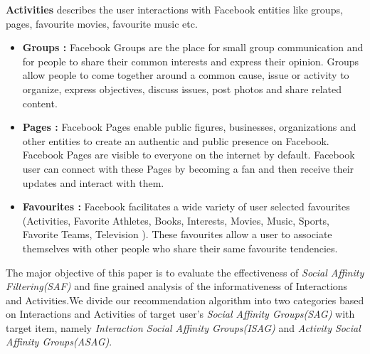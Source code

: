 {\bf Activities} describes the user interactions with Facebook entities like groups, pages, favourite movies, favourite music etc.
\begin{itemize}
  \item \textbf{Groups :} Facebook Groups are the place for small group communication and for people to share their common interests 
  						and express their opinion. Groups allow people to come together around a common cause, issue or activity to
  						organize, express objectives, discuss issues, post photos and share related content.
  \item \textbf{Pages :}  Facebook Pages enable public figures, businesses, organizations and other entities to create an authentic 
  						and public presence on Facebook. Facebook Pages are visible to everyone on the internet 
  						by default. Facebook user can connect with these Pages by becoming a fan and then receive their updates and interact with them.
  \item \textbf{Favourites :} Facebook facilitates a wide variety of user selected favourites (Activities, Favorite Athletes, Books, 
  							Interests, Movies, Music, Sports, Favorite Teams, Television ). These favourites allow a user to associate themselves with other people who share their same favourite tendencies.
\end{itemize} 


The major objective of this paper is to evaluate the effectiveness of \textit{Social Affinity Filtering(SAF)} and fine grained 
analysis of the informativeness of Interactions and Activities.We divide our recommendation algorithm into two categories based 
on Interactions and Activities of target user's \textit{ Social Affinity Groups(SAG)} with target item, 
namely \textit{Interaction  Social Affinity Groups(ISAG)} and \textit{Activity Social Affinity Groups(ASAG)}.

